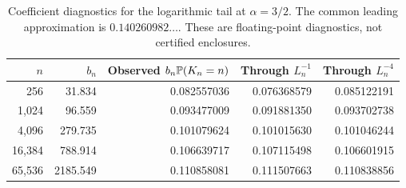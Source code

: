 \begin{table}[htbp]\centering\small
\begin{tabular}{rrrrr}\toprule
$n$ & $b_n$ & Observed $b_n\mathbb P(K_n=n)$ & Through $L_n^{-1}$ & Through $L_n^{-4}$\\\midrule
256 & 31.834 & 0.082557036 & 0.076368579 & 0.085122191 \\
1,024 & 96.559 & 0.093477009 & 0.091881350 & 0.093702738 \\
4,096 & 279.735 & 0.101079624 & 0.101015630 & 0.101046244 \\
16,384 & 788.914 & 0.106639717 & 0.107115498 & 0.106601915 \\
65,536 & 2185.549 & 0.110858081 & 0.111507663 & 0.110838856 \\
\bottomrule\end{tabular}
\caption{Coefficient diagnostics for the logarithmic tail at $\alpha=3/2$. The common leading approximation is $0.140260982\ldots$. These are floating-point diagnostics, not certified enclosures.}\label{tab:coeff}
\end{table}
